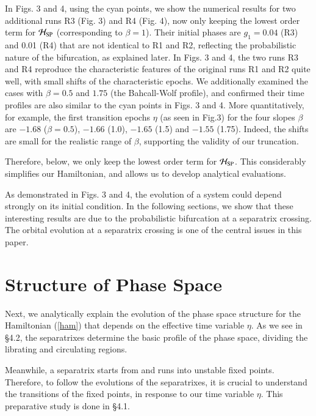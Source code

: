\documentclass[useAMS,usenatbib,twocolumn]{mn2e}
\begin{document}
In Figs. 3 and 4, using the cyan points, we show the numerical results for two additional  runs R3 (Fig. 3) and R4 (Fig. 4), now only keeping the lowest order term for $\mathcal{H}_{\rm SP}$ (corresponding to $\beta=1$).  Their initial phases are $g_1=0.04$ (R3) and 0.01 (R4) that are not identical to R1 and R2, reflecting the probabilistic nature of the bifurcation, as explained later. In Figs. 3 and 4, the two runs R3 and R4 reproduce the characteristic features of the original runs R1 and R2 quite well, with small shifts of the characteristic epochs.
We additionally examined the cases with $\beta=0.5$ and $1.75$ (the Bahcall-Wolf profile), and confirmed their time profiles  are also similar to the cyan points in Figs. 3 and 4. More quantitatively, for example,  the first transition epochs $\eta$ (as seen in  Fig.3) for the four slopes $\beta$ are $-1.68$ ($\beta=0.5$), $-1.66$ (1.0), $-1.65$ (1.5) and $-1.55$ (1.75).  Indeed, the shifts are small for the realistic range of $\beta$,  supporting the validity of our truncation. 

 Therefore, below, we only keep the lowest order term for $\mathcal{H}_{\rm SP}$. This considerably simplifies our Hamiltonian, and allows us to develop analytical evaluations. 

As demonstrated in Figs. 3 and 4, the evolution of a system could  depend strongly on its initial condition. 
In the following sections, we show that these interesting results are  due to  
the probabilistic bifurcation at a separatrix crossing. 
The orbital evolution at a separatrix crossing is one of the 
central issues in this paper.





\section{Structure of Phase Space}





Next, we analytically explain the evolution of the phase space structure for the Hamiltonian (\ref{ham}) 
that depends on the effective time variable $\eta$. 
As we see in \S 4.2, the separatrixes determine the basic profile of the phase space, dividing the librating 
and circulating regions.

Meanwhile, a separatrix starts from and runs into unstable fixed points. Therefore, to follow the evolutions of the separatrixes, 
it is crucial to understand the transitions of the fixed points, in response to our time variable $\eta$.
This preparative study is done in \S 4.1.
 
\end{document}
